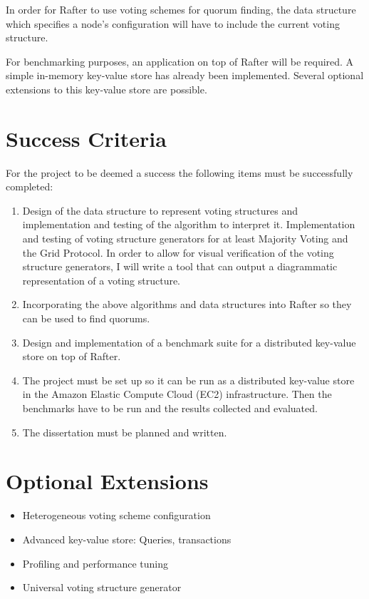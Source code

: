 \documentclass[12pt]{scrartcl}
\begin{document}
In order for Rafter to use voting schemes for quorum finding, the data structure which specifies a node's configuration will have to include the current voting structure.

For benchmarking purposes, an application on top of Rafter will be required. A simple in-memory key-value store has already been implemented. Several optional extensions to this key-value store are possible.

\section{Success Criteria%
  \label{success-criteria}%
}

For the project to be deemed a success the following items must be successfully completed:

\begin{enumerate}

\item Design of the data structure to represent voting structures and implementation and testing of the algorithm to interpret it. Implementation and testing of voting structure generators for at least Majority Voting and the Grid Protocol. In order to allow for visual verification of the voting structure generators, I will write a tool that can output a diagrammatic representation of a voting structure.

\item Incorporating the above algorithms and data structures into Rafter so they can be used to find quorums.

\item Design and implementation of a benchmark suite for a distributed key-value store on top of Rafter.

\item The project must be set up so it can be run as a distributed key-value store in the Amazon Elastic Compute Cloud (EC2) infrastructure. Then the benchmarks have to be run and the results collected and evaluated.

\item The dissertation must be planned and written.

\end{enumerate}

\section{Optional Extensions%
  \label{optional-extensions}%
}
%
\begin{itemize}

\item Heterogeneous voting scheme configuration

\item Advanced key-value store: Queries, transactions

\item Profiling and performance tuning

\item Universal voting structure generator

\end{itemize}
\end{document}
